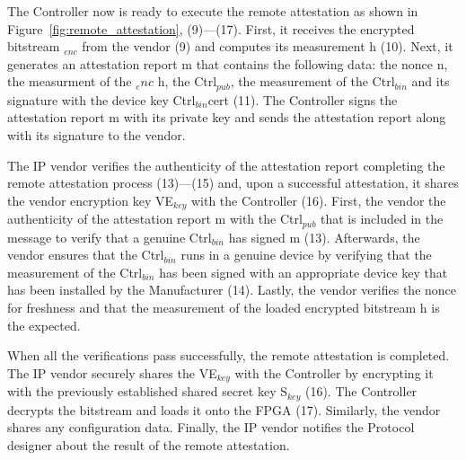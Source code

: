  The Controller now is ready to execute the remote attestation as shown in Figure~\ref{fig:remote_attestation}, (9)---(17). First, it receives the encrypted bitstream \projecttitle{}$_{enc}$ from the vendor (9) and computes its measurement h (10). Next, it generates an attestation report m that contains the following data: the nonce n, the measurment of the \projecttitle{}$_enc$ h, the Ctrl$_{pub}$, the measurement of the Ctrl$_{bin}$ and its signature with the device key Ctrl$_{bin}$cert (11). The Controller signs the attestation report m with its private key and sends the attestation report along with its signature to the vendor.%

The IP vendor verifies the authenticity of the attestation report completing the remote attestation process (13)---(15) and, upon a successful attestation, it shares the vendor encryption key VE$_{key}$ with the Controller (16). First, the vendor the authenticity of the attestation report m with the Ctrl$_{pub}$ that is included in the message to verify that a genuine Ctrl$_{bin}$ has signed m (13). Afterwards, the vendor ensures that the Ctrl$_{bin}$ runs in a genuine \projecttitle{} device by verifying that the measurement of the Ctrl$_{bin}$ has been signed with an appropriate device key that has been installed by the Manufacturer (14). Lastly, the vendor verifies the nonce for freshness and that the measurement of the loaded encrypted bitstream h is the expected. 

When all the verifications pass successfully, the remote attestation is completed. The IP vendor securely shares the VE$_{key}$ with the Controller by encrypting it with the previously established shared secret key S$_{key}$ (16).  The Controller decrypts the \projecttitle{} bitstream and loads it onto the FPGA (17). Similarly, the vendor shares any configuration data. Finally, the IP vendor notifies the Protocol designer about the result of the remote attestation.


